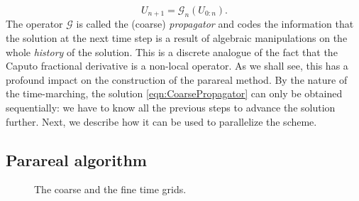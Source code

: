 \documentclass[12pt,a4paper]{article}
\begin{document}
\begin{equation}\label{eqn:CoarsePropagator}
	U_{n+1} = \mathcal{G}_n\left(U_{0:n}\right).
\end{equation}
The operator $\mathcal{G}$ is called the (coarse) \emph{propagator} and codes the information that the solution at the next time step is a result of algebraic manipulations on the whole \emph{history} of the solution. This is a discrete analogue of the fact that the Caputo fractional derivative is a non-local operator. As we shall see, this has a profound impact on the construction of the parareal method. By the nature of the time-marching, the solution \eqref{eqn:CoarsePropagator} can only be obtained sequentially: we have to know all the previous steps to advance the solution further. Next, we describe how it can be used to parallelize the scheme. 

\subsection{Parareal algorithm}\label{sec:Parareal}
\begin{figure}
	\centering
	\caption{The coarse and the fine time grids.}
	\label{fig:TimeGrids}
\end{figure}
\end{document}
